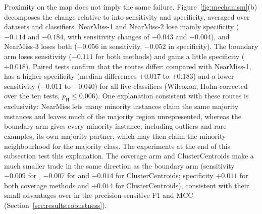 Proximity on the map does not imply the same failure. Figure~\ref{fig:mechanism}(b) decomposes the change relative to \RUS{} into sensitivity and specificity, averaged over datasets and classifiers. NearMiss-1 and NearMiss-2 lose mainly specificity ($-0.114$ and $-0.184$, with sensitivity changes of $-0.043$ and $-0.004$), and NearMiss-3 loses both ($-0.056$ in sensitivity, $-0.052$ in specificity). The boundary arm loses sensitivity ($-0.111$ for both methods) and gains a little specificity ($+0.018$). Paired tests confirm that the routes differ: compared with NearMiss-1, \MUSBS{} has a higher specificity (median differences $+0.017$ to $+0.183$) and a lower sensitivity ($-0.011$ to $-0.040$) for all five classifiers (Wilcoxon, Holm-corrected over the ten tests, $p_\mathrm{H}\le0.006$). One explanation consistent with these routes is exclusivity: NearMiss lets many minority instances claim the same majority instances and leaves much of the majority region unrepresented, whereas the boundary arm gives every minority instance, including outliers and rare examples, its own majority partner, which may then claim the minority neighbourhood for the majority class. The experiments at the end of this subsection test this explanation. The coverage arm and ClusterCentroids make a much smaller trade in the same direction as the boundary arm (sensitivity $-0.009$ for \MUSCS, $-0.007$ for \MUSCO{} and $-0.014$ for ClusterCentroids; specificity $+0.011$ for both coverage methods and $+0.014$ for ClusterCentroids), consistent with their small advantages over \RUS{} in the precision-sensitive F1 and MCC (Section~\ref{sec:results:robustness}).

